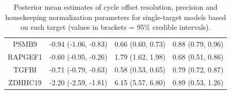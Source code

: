 \documentclass[../thesis.tex]{subfiles}
\begin{document}
\begin{table}[ht]
\begin{tabular}{cccc}
  PSMB9 & -0.94 (-1.06, -0.83) & 0.66 (0.60, 0.73) & 0.88 (0.79, 0.96) \\ 
  RAPGEF1 & -0.60 (-0.95, -0.26) & 1.79 (1.62, 1.98) & 0.68 (0.51, 0.86) \\ 
  TGFBI & -0.71 (-0.79, -0.63) & 0.58 (0.53, 0.65) & 0.79 (0.72, 0.87) \\ 
  ZDHHC19 & -2.20 (-2.59, -1.81) & 6.15 (5.57, 6.80) & 0.89 (0.53, 1.26) \\ 
   \hline
\end{tabular}
\caption{Posterior mean estimates of cycle offset resolution, precision and housekeeping normalization parameters for single-target models based on each target (values in brackets = 95\% credible intervals). \label{tab:single_target_offset_models_summary}} 
\end{table}
\end{document}
